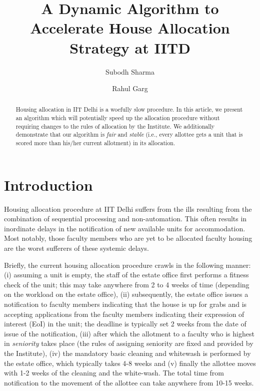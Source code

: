 \documentclass[a4paper,10pt]{article}
\begin{document}
\title {A Dynamic Algorithm to Accelerate House Allocation Strategy at IITD}
\author {Subodh Sharma \and Rahul Garg}
\maketitle

\begin{abstract}
Housing allocation in IIT Delhi is a woefully slow procedure. In this
article, we present an algorithm which will potentially speed up the
allocation procedure without requiring changes to the rules of allocation
by the Institute. We additionally demonstrate that our algorithm is
{\em fair} and {\em stable} (i.e., every allottee gets a unit that is
scored more than his/her current allotment) in its allocation.
\end{abstract}

\section{Introduction}
Housing allocation procedure at IIT Delhi suffers from the ills
resulting from the combination of sequential processing and
non-automation.  This often results in inordinate delays in the
notification of new available units for accommodation. Most notably,
those faculty members who are yet to be allocated faculty housing are
the worst sufferers of these systemic delays. 
%

Briefly, the current housing allocation procedure crawls in the
following manner: (i) assuming a unit is empty, the staff of the
estate office first performs a fitness check of the unit; this may
take anywhere from 2 to 4 weeks of time (depending on the workload on the 
estate office), (ii) subsequently, the estate
office issues a notification to faculty members indicating that the
house is up for grabs and is accepting applications from the faculty
members indicating their expression of interest (EoI) in the unit; the
deadline is typically set 2 weeks from the date of issue of the
notification, (iii) after which the allotment to a faculty who is
highest in {\em seniority} takes place (the rules of assigning
seniority are fixed and provided by the Institute), (iv) the mandatory 
basic cleaning and whitewash is performed by the estate office, 
which typically takes 4-8 weeks and (v) finally the allottee moves
with 1-2 weeks of the cleaning and the white-wash. The total time from 
notification to the movement of the allottee can take anywhere from 10-15 weeks. 
\end{document}
